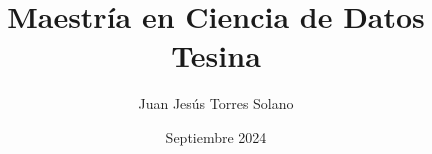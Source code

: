 \documentclass[a4paper,12pt]{book}
\begin{document}
\author{Juan Jesús Torres Solano}
\title{Maestría en Ciencia de Datos Tesina}
\date{Septiembre 2024}

\frontmatter
\maketitle
\tableofcontents

\mainmatter



\end{document}
